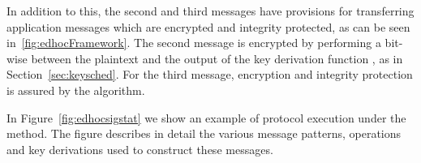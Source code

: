 \documentclass[runningheads]{llncs}
\begin{document}
In addition to this, the second and third messages have
provisions for transferring application messages which are encrypted and
integrity protected, as can be seen in~\ref{fig:edhocFramework}.
%
The second message is encrypted by performing a bit-wise \mXor{} between
the plaintext and the output of the key derivation function \mHkdf{}, as
in Section~\ref{sec:keysched}.
%
For the third message, encryption and integrity protection is assured by the
\mAead{} algorithm.
%

In Figure~\ref{fig:edhocsigstat} we show an example of protocol execution
under
the \mSigStat{} method.
%
The figure describes in detail the various message patterns, operations and
key derivations used to construct these messages.
%
\begin{figure}[ht]
\centering
{}
\end{figure}
\end{document}
